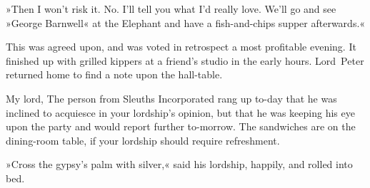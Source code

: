 »Then I won't risk it. No. I'll tell you what I'd really love. We'll go and see »George Barnwell« at the Elephant and have a fish-and-chips supper afterwards.«

This was agreed upon, and was voted in retrospect a most profitable evening. It finished up with grilled kippers at a friend's studio in the early hours. Lord~Peter returned home to find a note upon the hall-table.

\begin{mail}{}{My lord,}
	The person from Sleuths Incorporated rang up to-day that he was inclined to acquiesce in your lordship's opinion, but that he was keeping his eye upon the party and would report further to-morrow. The sandwiches are on the dining-room table, if your lordship should require refreshment.
\end{mail}


»Cross the gypsy's palm with silver,« said his lordship, happily, and rolled into bed.